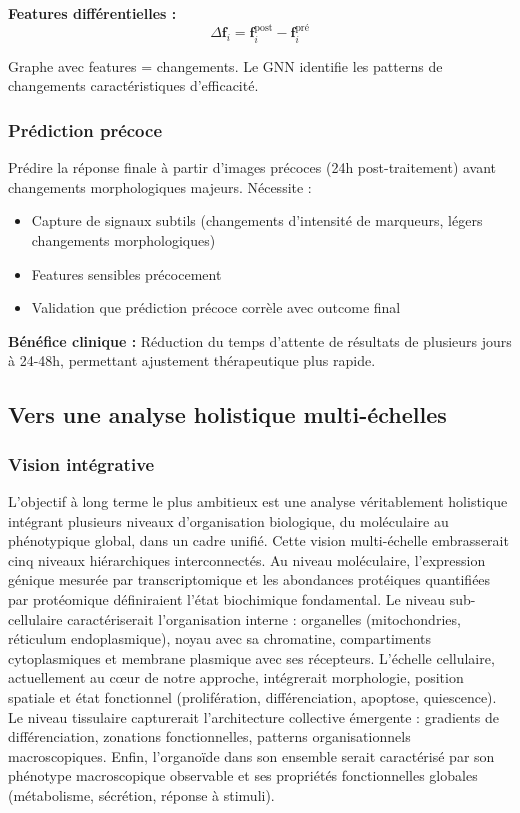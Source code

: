 \textbf{Features différentielles :}
\[
\Delta \mathbf{f}_i = \mathbf{f}_i^{\text{post}} - \mathbf{f}_i^{\text{pré}}
\]

Graphe avec features = changements. Le GNN identifie les patterns de changements caractéristiques d'efficacité.

\subsubsection{Prédiction précoce}

Prédire la réponse finale à partir d'images précoces (24h post-traitement) avant changements morphologiques majeurs. Nécessite :
\begin{itemize}
    \item Capture de signaux subtils (changements d'intensité de marqueurs, légers changements morphologiques)
    \item Features sensibles précocement
    \item Validation que prédiction précoce corrèle avec outcome final
\end{itemize}

\textbf{Bénéfice clinique :}
Réduction du temps d'attente de résultats de plusieurs jours à 24-48h, permettant ajustement thérapeutique plus rapide.

\subsection{Vers une analyse holistique multi-échelles}

\subsubsection{Vision intégrative}

L'objectif à long terme le plus ambitieux est une analyse véritablement holistique intégrant plusieurs niveaux d'organisation biologique, du moléculaire au phénotypique global, dans un cadre unifié. Cette vision multi-échelle embrasserait cinq niveaux hiérarchiques interconnectés. Au niveau moléculaire, l'expression génique mesurée par transcriptomique et les abondances protéiques quantifiées par protéomique définiraient l'état biochimique fondamental. Le niveau sub-cellulaire caractériserait l'organisation interne : organelles (mitochondries, réticulum endoplasmique), noyau avec sa chromatine, compartiments cytoplasmiques et membrane plasmique avec ses récepteurs. L'échelle cellulaire, actuellement au cœur de notre approche, intégrerait morphologie, position spatiale et état fonctionnel (prolifération, différenciation, apoptose, quiescence). Le niveau tissulaire capturerait l'architecture collective émergente : gradients de différenciation, zonations fonctionnelles, patterns organisationnels macroscopiques. Enfin, l'organoïde dans son ensemble serait caractérisé par son phénotype macroscopique observable et ses propriétés fonctionnelles globales (métabolisme, sécrétion, réponse à stimuli).

